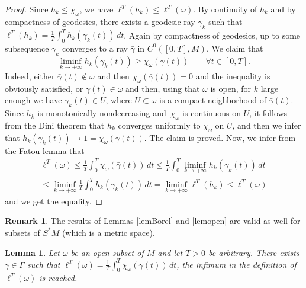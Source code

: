 \documentclass[10pt]{amsart}
\newtheorem{lemma}{Lemma}
\theoremstyle{definition}
\newtheorem{remark}{Remark}
\begin{document}
\begin{proof}
Since $h_k\leq\chi_{\omega}$, we have $\ell^T(h_k)\leq \ell^T(\omega)$.
By continuity of $h_k$ and by compactness of geodesics, there exists a geodesic ray $\gamma_k$ such that $\ell^T(h_k) = \frac{1}{T} \int_0^T h_k(\gamma_k(t))\, dt$. Again by compactness of geodesics, up to some subsequence $\gamma_k$ converges to a ray $\bar\gamma$ in $C^0([0,T],M)$. We claim that
\[
\liminf_{k\rightarrow+\infty} h_k(\gamma_k(t))\geq \chi_\omega(\bar\gamma(t))\qquad\forall t\in[0,T].
\]
Indeed, either $\bar\gamma(t)\notin\omega$ and then $\chi_\omega(\bar\gamma(t))=0$ and the inequality is obviously satisfied, or $\bar\gamma(t)\in\omega$ and then, using that $\omega$ is open, for $k$ large enough we have $\gamma_k(t)\in U$, where $U\subset\omega$ is a compact neighborhood of $\bar\gamma(t)$. Since $h_k$ is monotonically nondecreasing and~$\chi_\omega$ is continuous on $U$, it follows from the Dini theorem that $h_k$ converges uniformly to $\chi_\omega$ on $U$, and then we infer that $h_k(\gamma_k(t))\rightarrow 1=\chi_\omega(\bar\gamma(t))$. The claim is proved.
Now, we infer from the Fatou lemma that
\begin{multline*}
\ell^T(\omega) \leq \frac{1}{T}\int_0^T\chi_\omega(\bar\gamma(t))\, dt
\leq \frac{1}{T}\int_0^T \liminf_{k\rightarrow+\infty} h_k(\gamma_k(t)) \, dt \\
\leq \liminf_{k\rightarrow+\infty} \frac{1}{T}\int_0^T h_k(\gamma_k(t)) \, dt
= \liminf_{k\rightarrow+\infty} \ell^T(h_k)
\leq \ell^T(\omega)
\end{multline*}
and we get the equality.
\end{proof}

\begin{remark}
The results of Lemmas \ref{lemBorel} and \ref{lemopen} are valid as well for subsets of $S^*M$ (which is a metric space).
\end{remark}

\begin{lemma}\label{lemg2open}
Let $\omega$ be an open subset of $M$ and let $T>0$ be arbitrary.
There exists $\gamma\in\Gamma$ such that $\ell^T(\omega) = \frac{1}{T}\int_0^T\chi_\omega(\gamma(t))\, dt$, \ie the infimum in the definition of $\ell^T(\omega)$ is reached.
\end{lemma}
\end{document}
